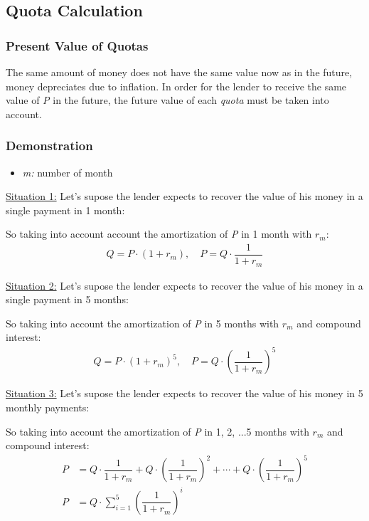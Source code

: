 \documentclass{article}
\begin{document}
\subsection{Quota Calculation}

\subsubsection{Present Value of Quotas}
The same amount of money does not have the same value now as in the future, money depreciates due to inflation. In order for the lender to receive the same value of \textit{P} in the future, the future value of each \textit{quota} must be taken into account.

\subsubsection{Demonstration}
\begin{itemize}
    \item \textit{m:} number of month
\end{itemize}

\underline{Situation 1:} Let's supose the lender expects to recover the value of his money in a single payment in 1 month:

So taking into account account the amortization of \textit{P} in 1 month with $r_m$:
\begin{align*}
Q = P \cdot (1 + r_m),\quad P = Q \cdot \dfrac{1}{1 + r_m}
\end{align*}

\underline{Situation 2:} Let's supose the lender expects to recover the value of his money in a single payment in 5 months:

So taking into account the amortization of \textit{P} in 5 months with $r_m$ and compound interest:
\begin{align*}
Q = P \cdot (1 + r_m)^5,\quad P = Q \cdot \left(\dfrac{1}{1 + r_m}\right)^5
\end{align*}

\underline{Situation 3:} Let's supose the lender expects to recover the value of his money in 5 monthly payments:

So taking into account the amortization of \textit{P} in 1, 2, ...5 months with $r_m$ and compound interest:
\begin{align*}
P &= Q \cdot \dfrac{1}{1 + r_m} + Q \cdot \left(\dfrac{1}{1 + r_m}\right)^2 + \cdots + Q \cdot \left(\dfrac{1}{1 + r_m}\right)^5 \\
P &= Q \cdot \sum_{i=1}^{5}\left(\dfrac{1}{1 + r_m}\right)^i
\end{align*}
\end{document}
